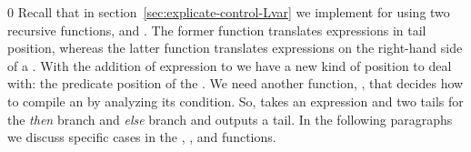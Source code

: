 \documentclass[7x10]{TimesAPriori_MIT}%
\def\racketEd{0}
\def\edition{1}
\numberwithin{theorem}{chapter}
\numberwithin{definition}{chapter}
\numberwithin{equation}{chapter}
\begin{document}
{\if\edition\racketEd        
%
Recall that in section~\ref{sec:explicate-control-Lvar} we implement
 for \LangVar{} using two recursive
functions,  and .  The
former function translates expressions in tail position, whereas the
latter function translates expressions on the right-hand side of a
. With the addition of  expression to \LangIf{} we
have a new kind of position to deal with: the predicate position of
the . We need another function, , that
decides how to compile an  by analyzing its condition.  So,
 takes an \LangIf{} expression and two
\LangCIf{} tails for the \emph{then} branch and \emph{else} branch
and outputs a tail.  In the following paragraphs we discuss specific
cases in the , , and
 functions.
%
\fi}
%
\end{document}
